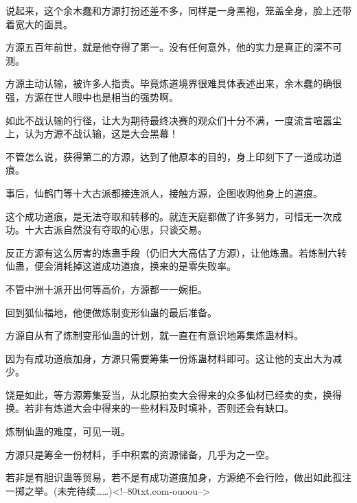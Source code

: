 \begin{this_body}
说起来，这个余木蠢和方源打扮还差不多，同样是一身黑袍，笼盖全身，脸上还带着宽大的面具。

方源五百年前世，就是他夺得了第一。没有任何意外，他的实力是真正的深不可测。

方源主动认输，被许多人指责。毕竟炼道境界很难具体表述出来，余木蠢的确很强，方源在世人眼中也是相当的强势啊。

如此不战认输的行径，让大为期待最终决赛的观众们十分不满，一度流言喧嚣尘上，认为方源不战认输，这是大会黑幕！

不管怎么说，获得第二的方源，达到了他原本的目的，身上印刻下了一道成功道痕。

事后，仙鹤门等十大古派都接连派人，接触方源，企图收购他身上的道痕。

这个成功道痕，是无法夺取和转移的。就连天庭都做了许多努力，可惜无一次成功。十大古派自然没有夺取的心思，只谈交易。

反正方源有这么厉害的炼蛊手段（仍旧大大高估了方源），让他炼蛊。若炼制六转仙蛊，便会消耗掉这道成功道痕，换来的是零失败率。

不管中洲十派开出何等高价，方源都一一婉拒。

回到狐仙福地，他便做炼制变形仙蛊的最后准备。

方源自从有了炼制变形仙蛊的计划，就一直在有意识地筹集炼蛊材料。

因为有成功道痕加身，方源只需要筹集一份炼蛊材料即可。这让他的支出大为减少。

饶是如此，等方源筹集妥当，从北原拍卖大会得来的众多仙材已经卖的卖，换得换。若非有炼道大会中得来的一些材料及时填补，否则还会有缺口。

炼制仙蛊的难度，可见一斑。

方源只是筹全一份材料，手中积累的资源储备，几乎为之一空。

若非是有胆识蛊等贸易，若不是有成功道痕加身，方源绝不会行险，做出如此孤注一掷之举。(未完待续……)<!--80txt.com-ouoou-->

\end{this_body}

